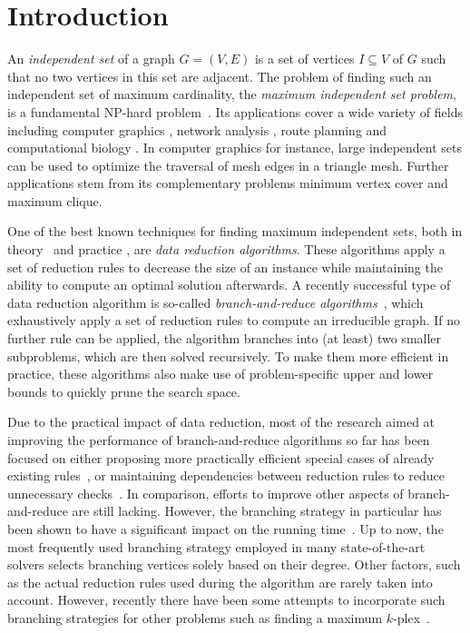 \documentclass[a4paper,UKenglish,cleveref, autoref, thm-restate]{lipics-v2021}
\begin{document}
\newpage

\section{Introduction}

An \emph{independent set} of a graph $G = (V,E)$ is a set of vertices $I \subseteq V$ of $G$ such that no two vertices in this set are adjacent.
The problem of finding such an independent set of maximum cardinality, the \emph{maximum independent set problem}, is a fundamental NP-hard problem~\cite{Garey1974}.
Its applications cover a wide variety of fields including computer graphics \cite{CG}, network analysis \cite{NW}, route planning \cite{RP} and computational biology \cite{BIO1, BIO2}.
In computer graphics for instance, large independent sets can be used to optimize the traversal of mesh edges in a triangle mesh.
Further applications stem from its complementary problems minimum vertex cover and maximum clique.

One of the best known techniques for finding maximum independent sets, both in
theory~\cite{XiaoNagamochi, ChenXiaKanj} and practice \cite{AkibaIwata}, are
\emph{data reduction algorithms}.
These algorithms apply a set of reduction rules to decrease the size of an instance while maintaining the ability to compute an optimal solution afterwards.
A recently successful type of data reduction algorithm is so-called
\emph{branch-and-reduce algorithms}~\cite{AkibaIwata,WGYC}, which exhaustively
apply a set of reduction rules to compute an irreducible graph.
If no further rule can be applied, the algorithm branches into (at least) two
smaller subproblems, which are then solved recursively.
To make them more efficient in practice, these algorithms also make use of problem-specific upper and lower bounds to quickly prune the search space.

Due to the practical impact of data reduction, most of the research aimed at
improving the performance of branch-and-reduce algorithms so far has been
focused on either proposing more practically efficient special cases of already
existing rules~\cite{ChangKern,dahlum2016accelerating}, or maintaining
dependencies between reduction rules to reduce unnecessary
checks~\cite{alsahafy2020computing,hespe2019scalable}.
In comparison, efforts to improve other aspects of branch-and-reduce are still lacking.
However, the branching strategy in particular has been shown to have a significant impact on the running time~\cite{AkibaIwata}.
Up to now, the most frequently used branching strategy employed in many state-of-the-art solvers selects branching vertices solely based on their degree.
Other factors, such as the actual reduction rules used during the algorithm are rarely taken into account.
However, recently there have been some attempts to incorporate such branching
strategies for other problems such as finding a maximum $k$-plex~\cite{gao2018exact}.
\end{document}

